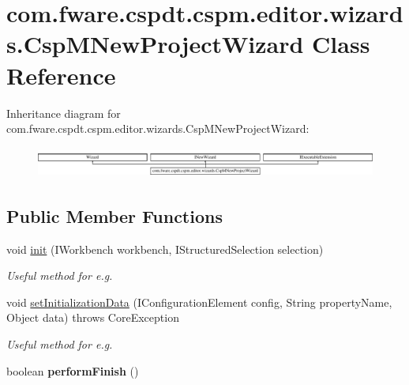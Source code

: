 \hypertarget{classcom_1_1fware_1_1cspdt_1_1cspm_1_1editor_1_1wizards_1_1_csp_m_new_project_wizard}{}\section{com.\+fware.\+cspdt.\+cspm.\+editor.\+wizards.\+Csp\+M\+New\+Project\+Wizard Class Reference}
\label{classcom_1_1fware_1_1cspdt_1_1cspm_1_1editor_1_1wizards_1_1_csp_m_new_project_wizard}
Inheritance diagram for com.\+fware.\+cspdt.\+cspm.\+editor.\+wizards.\+Csp\+M\+New\+Project\+Wizard\+:\begin{figure}[H]
\begin{center}
\leavevmode
\includegraphics[height=1.009009cm]{classcom_1_1fware_1_1cspdt_1_1cspm_1_1editor_1_1wizards_1_1_csp_m_new_project_wizard}
\end{center}
\end{figure}
\subsection*{Public Member Functions}
\begin{DoxyCompactItemize}
\item 
void \hyperlink{classcom_1_1fware_1_1cspdt_1_1cspm_1_1editor_1_1wizards_1_1_csp_m_new_project_wizard_aef48169ceaae80adece31a15b81bbac3}{init} (I\+Workbench workbench, I\+Structured\+Selection selection)
\begin{DoxyCompactList}\small\item\em Useful method for e.\+g. \end{DoxyCompactList}\item 
void \hyperlink{classcom_1_1fware_1_1cspdt_1_1cspm_1_1editor_1_1wizards_1_1_csp_m_new_project_wizard_a7fa1f6fbf60bcc5258b6b8ca31bab003}{set\+Initialization\+Data} (I\+Configuration\+Element config, String property\+Name, Object data)  throws Core\+Exception 
\begin{DoxyCompactList}\small\item\em Useful method for e.\+g. \end{DoxyCompactList}\item 
\mbox{\label{classcom_1_1fware_1_1cspdt_1_1cspm_1_1editor_1_1wizards_1_1_csp_m_new_project_wizard_a74511e744b035b25a47a25c9636668cf}} 
boolean {\bfseries perform\+Finish} ()
\end{DoxyCompactItemize}



